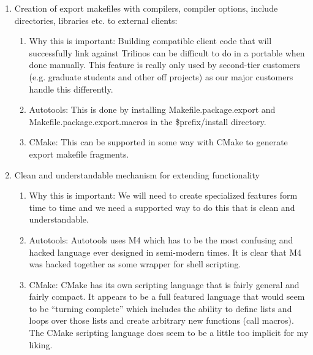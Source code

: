 \documentclass[pdf,ps2pdf,11pt]{SANDreport}
\begin{document}
\begin{enumerate}
\begin{enumerate}
  \end{enumerate}

{}\item Creation of export makefiles with compilers, compiler
options, include directories, libraries etc. to external clients:

  \begin{enumerate}

  {}\item Why this is important: Building compatible client code
  that will successfully link against Trilinos can be difficult to
  do in a portable when done manually.  This feature is really only used
  by second-tier customers (e.g. graduate students and other off
  projects) as our major customers handle this differently.

  {}\item Autotools: This is done by installing
  Makefile.package.export and Makefile.package.export.macros in the
  \$prefix/install directory.

  {}\item CMake: This can be supported in some way with CMake to
  generate export makefile fragments.

  \end{enumerate}

{}\item Clean and understandable mechanism for extending
functionality

  \begin{enumerate}

  {}\item Why this is important: We will need to create specialized
  features form time to time and we need a supported way to do this
  that is clean and understandable.

  {}\item Autotools: Autotools uses M4 which has to be the most
  confusing and hacked language ever designed in semi-modern times.
  It is clear that M4 was hacked together as some wrapper for shell
  scripting.

  {}\item CMake: CMake has its own scripting language that is fairly
  general and fairly compact.  It appears to be a full featured
  language that would seem to be ``turning complete'' which includes
  the ability to define lists and loops over those lists and create
  arbitrary new functions (call macros).  The CMake scripting
  language does seem to be a little too implicit for my liking.


\end{enumerate}
\end{enumerate}
\end{document}
